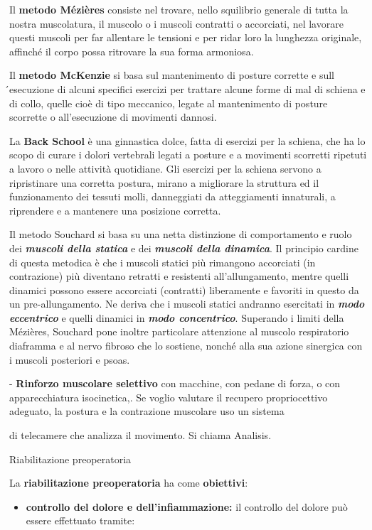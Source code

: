 \documentclass[]{article}
\begin{document}
Il \textbf{metodo Mézières} consiste nel trovare, nello squilibrio
generale di tutta la nostra muscolatura, il muscolo o i muscoli
contratti o accorciati, nel lavorare questi muscoli per far allentare le
tensioni e per ridar loro la lunghezza originale, affinché il corpo
possa ritrovare la sua forma armoniosa.

Il \textbf{metodo McKenzie} si basa sul mantenimento di posture corrette
e sull ́esecuzione di alcuni specifici esercizi per trattare alcune forme
di mal di schiena e di collo, quelle cioè di tipo meccanico, legate al
mantenimento di posture scorrette o all'esecuzione di movimenti dannosi.

La \textbf{Back School} è una ginnastica dolce, fatta di esercizi per la
schiena, che ha lo scopo di curare i dolori vertebrali legati a posture
e a movimenti scorretti ripetuti a lavoro o nelle attività quotidiane.
Gli esercizi per la schiena servono a ripristinare una corretta postura,
mirano a migliorare la struttura ed il funzionamento dei tessuti molli,
danneggiati da atteggiamenti innaturali, a riprendere e a mantenere una
posizione corretta.

Il metodo Souchard si basa su una netta distinzione di comportamento e
ruolo dei \emph{\textbf{muscoli della statica}} e dei
\emph{\textbf{muscoli della dinamica}}. Il principio cardine di questa
metodica è che i muscoli statici più rimangono accorciati (in
contrazione) più diventano retratti e resistenti all'allungamento,
mentre quelli dinamici possono essere accorciati (contratti) liberamente
e favoriti in questo da un pre-allungamento. Ne deriva che i muscoli
statici andranno esercitati in \emph{\textbf{modo eccentrico}} e quelli
dinamici in \emph{\textbf{modo concentrico}}. Superando i limiti della
Mézières, Souchard pone inoltre particolare attenzione al muscolo
respiratorio diaframma e al nervo fibroso che lo sostiene, nonché alla
sua azione sinergica con i muscoli posteriori e psoas.

- \textbf{Rinforzo muscolare selettivo} con macchine, con pedane di
forza, o con apparecchiatura isocinetica,. Se voglio valutare il
recupero propriocettivo adeguato, la postura e la contrazione muscolare
uso un sistema

di telecamere che analizza il movimento. Si chiama Analisis.

Riabilitazione preoperatoria

La \textbf{riabilitazione preoperatoria} ha come \textbf{obiettivi}:

\begin{itemize}
\item
  \textbf{controllo del dolore e dell'infiammazione:} il controllo del
  dolore può essere effettuato tramite:
\end{itemize}
\end{document}
